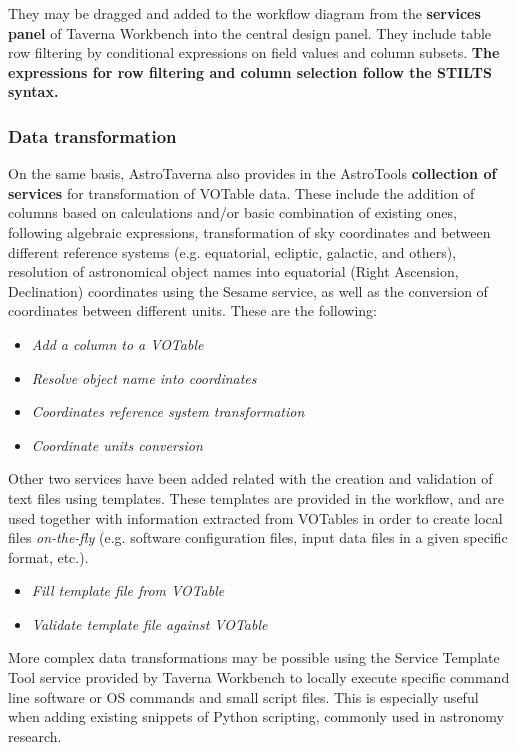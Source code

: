 \documentclass{aa}
\begin{document}
They may be dragged and added to the workflow diagram from the \textbf{services panel} of Taverna Workbench into the central design panel. They include table row filtering by conditional expressions on field values and column subsets. \textbf{The expressions for row filtering and column selection follow the STILTS syntax.}

\subsubsection{Data transformation}
\label{DataTransformation}

On the same basis, AstroTaverna also provides in the AstroTools \textbf{collection of services} for transformation of VOTable data. These include the addition of columns based on calculations and/or basic combination of existing ones, following algebraic expressions, transformation of sky coordinates and between different reference systems (e.g. equatorial, ecliptic, galactic, and others), resolution of astronomical object names into equatorial (Right Ascension, Declination) coordinates using the Sesame service, as well as the conversion of coordinates between different units. These are the following:

\begin{itemize}
\item \textit{Add a column to a VOTable}
\item \textit{Resolve object name into coordinates} 
\item \textit{Coordinates reference system transformation}
\item \textit{Coordinate units conversion}
\end{itemize}

Other two services have been added related with the creation and validation of text files using templates. These templates are provided in the workflow, and are used together with information extracted from VOTables in order to create local files \textit{on-the-fly} (e.g. software configuration files, input data files in a given specific format, etc.).

\begin{itemize}
\item \textit{Fill template file from VOTable}
\item \textit{Validate template file against VOTable}
\end{itemize}

More complex data transformations may be possible using the Service Template Tool service provided by Taverna Workbench to locally execute specific command line software or OS commands and small script files. This is especially useful when adding existing snippets of Python scripting, commonly used in astronomy research.  
\end{document}

